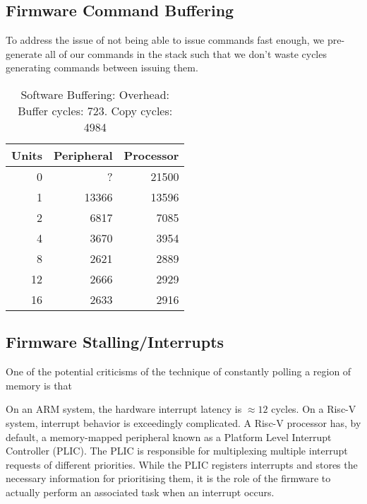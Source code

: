 \documentclass[a4paper,8pt]{report}
\begin{document}
\subsection{Firmware Command Buffering}
To address the issue of not being able to issue commands fast enough, we
pre-generate all of our commands in the stack such that we don't waste cycles
generating commands between issuing them.


\begin{table}
  \centering
  \begin{tabular}{r|rr}
    \toprule
    Units & Peripheral & Processor\\
    \midrule
    0  &     ? & 21500 \\
    1  & 13366 & 13596 \\
    2  &  6817 &  7085 \\
    4  &  3670 &  3954 \\
    8  &  2621 &  2889 \\
    12 &  2666 &  2929 \\
    16 &  2633 &  2916 \\
    \bottomrule
  \end{tabular}
  \caption{Software Buffering: Overhead: Buffer cycles: 723. Copy cycles: 4984}
\end{table}



\subsection{Firmware Stalling/Interrupts}
One of the potential criticisms of the technique of constantly polling a region
of memory is that

On an ARM system, the hardware interrupt latency is $\approx 12$ cycles. On a
Risc-V system, interrupt behavior is exceedingly complicated. A Risc-V processor
has, by default, a memory-mapped peripheral known as a Platform Level Interrupt
Controller (PLIC). The PLIC is responsible for multiplexing multiple interrupt
requests of different priorities. While the PLIC registers interrupts and stores
the necessary information for prioritising them, it is the role of the firmware
to actually perform an associated task when an interrupt occurs.
\end{document}
